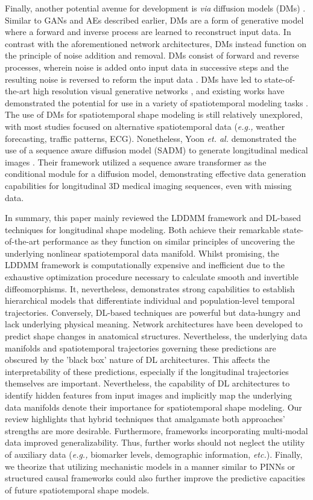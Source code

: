         Finally, another potential avenue for development is \textit{via} diffusion models (DMs) \cite{FuestMaGui24, 10081412, Kazerouni2023}. Similar to GANs and AEs described earlier, DMs are a form of generative model where a forward and inverse process are learned to reconstruct input data. In contrast with the aforementioned network architectures, DMs instead function on the principle of noise addition and removal. DMs consist of forward and reverse processes, wherein noise is added onto input data in successive steps and the resulting noise is reversed to reform the input data \cite{DDPM20}. DMs have led to state-of-the-art high resolution visual generative networks \cite{HRIS2021, DMBGIS21}, and existing works have demonstrated the potential for use in a variety of spatiotemporal modeling tasks \cite{ASDMTSSTD2024, NEURIPS2023_8df90a14}. The use of DMs for spatiotemporal shape modeling is still relatively unexplored, with most studies focused on alternative spatiotemporal data (\textit{e.g.,} weather forecasting, traffic patterns, ECG). Nonetheless, Yoon \textit{et. al.} demonstrated the use of a sequence aware diffusion model (SADM) to generate longitudinal medical images \cite{Yoon2023}. Their framework utilized a sequence aware transformer as the conditional module for a diffusion model, demonstrating effective data generation capabilities for longitudinal 3D medical imaging sequences, even with missing data.

		In summary, this paper mainly reviewed the LDDMM framework and DL-based techniques for longitudinal shape modeling. Both achieve their remarkable state-of-the-art performance as they function on similar principles of uncovering the underlying nonlinear spatiotemporal data manifold. Whilst promising, the LDDMM framework is computationally expensive and inefficient due to the exhaustive optimization procedure necessary to calculate smooth and invertible diffeomorphisms. It, nevertheless, demonstrates strong capabilities to establish hierarchical models that differentiate individual and population-level temporal trajectories. Conversely, DL-based techniques are powerful but data-hungry and lack underlying physical meaning. Network architectures have been developed to predict shape changes in anatomical structures. Nevertheless, the underlying data manifolds and spatiotemporal trajectories governing these predictions are obscured by the 'black box' nature of DL architectures. This affects the interpretability of these predictions, especially if the longitudinal trajectories themselves are important. Nevertheless, the capability of DL architectures to identify hidden features from input images and implicitly map the underlying data manifolds denote their importance for spatiotemporal shape modeling. Our review highlights that hybrid techniques that amalgamate both approaches' strengths are more desirable. Furthermore, frameworks incorporating multi-modal data improved generalizability. Thus, further works should not neglect the utility of auxiliary data (\textit{e.g.,} biomarker levels, demographic information, \textit{etc.}). Finally, we theorize that utilizing mechanistic models in a manner similar to PINNs or structured causal frameworks could also further improve the predictive capacities of future spatiotemporal shape models. 
